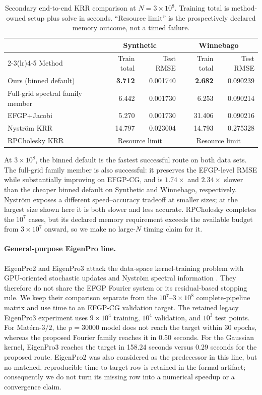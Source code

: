\begin{table}[H]
\centering
\footnotesize
\setlength{\tabcolsep}{4.2pt}
\caption{Secondary end-to-end KRR comparison at \(N=3\times10^8\).
Training total is method-owned setup plus solve in seconds.  ``Resource
limit'' is the prospectively declared memory outcome, not a timed failure.}
\label{tab:other-krr-300m}
\begin{tabular}{lrrrr}
\toprule
& \multicolumn{2}{c}{Synthetic} & \multicolumn{2}{c}{Winnebago} \\
\cmidrule(lr){2-3}\cmidrule(lr){4-5}
Method & Train total & Test RMSE & Train total & Test RMSE \\
\midrule
Ours (binned default) & \textbf{3.712} & 0.001740 & \textbf{2.682} & 0.090239 \\
Full-grid spectral family member & 6.442 & 0.001730 & 6.253 & 0.090214 \\
EFGP+Jacobi & 5.270 & 0.001730 & 31.406 & 0.090216 \\
Nystr\"om KRR & 14.797 & 0.023004 & 14.793 & 0.275328 \\
RPCholesky KRR & \multicolumn{2}{c}{Resource limit} & \multicolumn{2}{c}{Resource limit} \\
\bottomrule
\end{tabular}
\end{table}

At \(3\times10^8\), the binned default is the fastest successful route on both
data sets.  The full-grid family member is also successful: it preserves the
EFGP-level RMSE while substantially improving on EFGP-CG, and is
\(1.74\times\) and \(2.34\times\) slower than the cheaper binned default on
Synthetic and Winnebago, respectively.  Nystr\"om exposes a different
speed--accuracy tradeoff at smaller sizes; at the largest size shown here it
is both slower and less accurate.  RPCholesky completes the \(10^7\) cases,
but its declared memory requirement exceeds the available budget from
\(3\times10^7\) onward, so we make no large-\(N\) timing claim for it.

\paragraph{General-purpose EigenPro line.}
EigenPro2 and EigenPro3 attack the data-space kernel-training problem with
GPU-oriented stochastic updates and Nystr\"om spectral information
\cite{ma2019eigenpro,abedsoltan2023toward}.  They therefore do not share the
EFGP Fourier system or its residual-based stopping rule.  We keep their
comparison separate from the \(10^7\)--\(3\times10^8\) complete-pipeline
matrix and use time to an EFGP-CG validation target.  The retained legacy
EigenPro3 experiment uses \(9\times10^4\) training, \(10^4\) validation, and
\(10^3\) test points.  For Mat\'ern-\(3/2\), the \(p=30000\) model does not
reach the target within 30 epochs, whereas the proposed Fourier family reaches
it in 0.50 seconds.  For the Gaussian kernel, EigenPro3 reaches the target in
158.24 seconds versus 0.29 seconds for the proposed route.  EigenPro2 was also
considered as the predecessor in this line, but no matched, reproducible
time-to-target row is retained in the formal artifact; consequently we do not
turn its missing row into a numerical speedup or a convergence claim.

